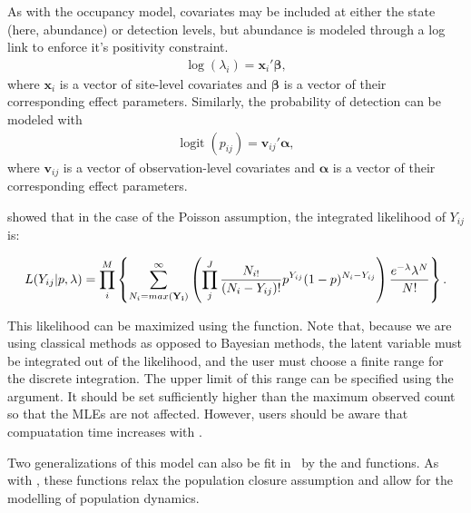 \documentclass[article,shortnames]{jss}
\DeclareMathOperator{\logit}{logit}
\newcommand{\um}{\pkg{unmarked}}
\begin{document}
As with the occupancy model, covariates may be included at either the
state (here, abundance) or detection levels, but abundance is modeled
through a log link to enforce it's positivity constraint.
\begin{gather}
  \log(\lambda_i) = \mathbf x_i' \mathbf \beta,
\end{gather}
where $\mathbf x_i$ is a vector of site-level covariates and $\mathbf \beta$
is a vector of their corresponding effect parameters.  Similarly, the
probability of detection can be modeled with
\begin{gather}
  \logit(p_{ij}) = \mathbf v_{ij}' \mathbf \alpha,
\end{gather}
where $\mathbf v_{ij}$ is a vector of observation-level covariates and
$\mathbf \alpha$ is a vector of their corresponding effect parameters.

\citet{Royle2004b} showed that in the case of the Poisson assumption, 
the integrated likelihood of $Y_{ij}$ is:

\begin{equation}
L(Y_{ij}| p,\lambda) = 
 \prod_{i}^{M} 
 \left\{ \sum_{N_{i}=max({\bf Y_i})}^{\infty}
          \left( \prod_{j}^{J} 
     \frac{N_{i!}}{ (N_{i}-Y_{ij})!} p^{Y_{ij}}(1-p)^{N_{i}-Y_{ij}} \right)
       \frac{e^{-\lambda} \lambda^N}{N!} \right\}.
\end{equation}

This likelihood can be maximized using the  function.  Note that,
because we are using classical methods as opposed to Bayesian methods, 
the latent variable  must be integrated out of the likelihood, and the
user must choose a finite range for the discrete integration. The upper 
limit of this range can be specified using the  argument.  It should
be set sufficiently higher than the maximum observed count so that the 
MLEs are not affected.  However, users should be aware that compuatation 
time increases with .

Two generalizations of this model can also be fit in \um\ by the 
 and  functions.  As with ,
these functions relax the population closure assumption and allow for 
the modelling of population dynamics.


     
\end{document}
